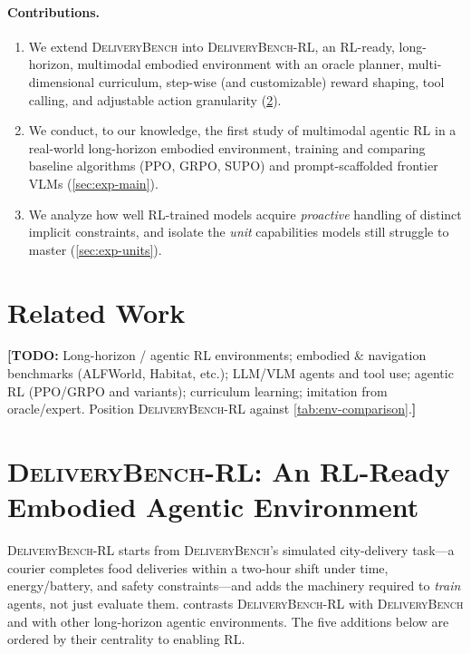 \documentclass[11pt]{article}
\newcommand{\ours}{\textsc{DeliveryBench-RL}\xspace}
\newcommand{\dbone}{\textsc{DeliveryBench}\xspace}
\newcommand{\TODO}[1]{{\color{red}\textbf{[TODO:} #1\textbf{]}}}
\begin{document}
\paragraph{Contributions.}
\begin{enumerate}[leftmargin=1.4em,itemsep=2pt,topsep=2pt]
  \item We extend \dbone into \ours, an RL-ready, long-horizon, multimodal
        embodied environment with an oracle planner, multi-dimensional
        curriculum, step-wise (and customizable) reward shaping, tool calling,
        and adjustable action granularity (\cref{sec:env}).
  \item We conduct, to our knowledge, the first study of multimodal agentic RL
        in a real-world long-horizon embodied environment, training and
        comparing baseline algorithms (PPO, GRPO, SUPO) and prompt-scaffolded
        frontier VLMs (\cref{sec:exp-main}).
  \item We analyze how well RL-trained models acquire \emph{proactive} handling
        of distinct implicit constraints, and isolate the \emph{unit}
        capabilities models still struggle to master (\cref{sec:exp-units}).
\end{enumerate}

\section{Related Work}
\label{sec:related}
\TODO{Long-horizon / agentic RL environments; embodied \& navigation
benchmarks (ALFWorld, Habitat, etc.); LLM/VLM agents and tool use; agentic RL
(PPO/GRPO and variants); curriculum learning; imitation from oracle/expert.
Position \ours against \cref{tab:env-comparison}.}

\section{\ours: An RL-Ready Embodied Agentic Environment}
\label{sec:env}

\ours starts from \dbone's simulated city-delivery task---a courier completes
food deliveries within a two-hour shift under time, energy/battery, and
safety constraints---and adds the machinery required to \emph{train} agents,
not just evaluate them.  contrasts \ours with \dbone
and with other long-horizon agentic environments. The five additions below are
ordered by their centrality to enabling RL.
\end{document}
